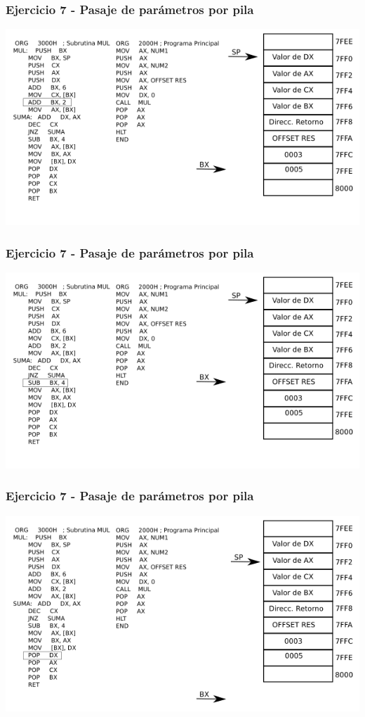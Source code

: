 \documentclass{beamer}
\begin{document}
\begin{frame}
\frametitle{Ejercicio 7 - Pasaje de parámetros por pila}
\includegraphics[scale=0.70]{imgs/imagen_012.png}
\end{frame}

\begin{frame}
\frametitle{Ejercicio 7 - Pasaje de parámetros por pila}
\includegraphics[scale=0.70]{imgs/imagen_013.png}
\end{frame}

\begin{frame}
\frametitle{Ejercicio 7 - Pasaje de parámetros por pila}
\includegraphics[scale=0.70]{imgs/imagen_014.png}
\end{frame}
\end{document}
